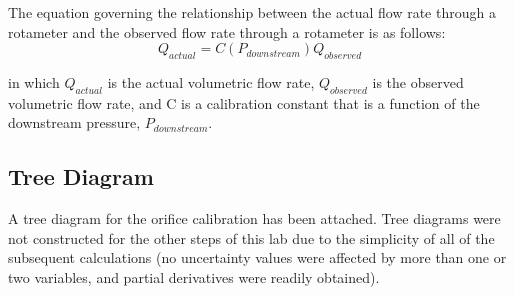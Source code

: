 \documentclass[paper=letter, fontsize=10pt]{scrartcl} %
\begin{document}
\begin{appendices}
The equation governing the relationship between the actual flow rate through a rotameter and the observed flow rate through a rotameter is as follows:
\begin{equation}\label{eq:4}
Q_{actual} = C(P_{downstream}) Q_{observed}
\end{equation}

in which \(Q_{actual}\) is the actual volumetric flow rate, \(Q_{observed}\) is the observed volumetric flow rate, and C is a calibration constant that is a function of the downstream pressure, \(P_{downstream}\).

\subsection{Tree Diagram}\label{app:Tree}
A tree diagram for the orifice calibration has been attached.  Tree diagrams were not constructed for the other steps of this lab due to the simplicity of all of the subsequent calculations (no uncertainty values were affected by more than one or two variables, and partial derivatives were readily obtained).

\end{appendices}
\end{document}
